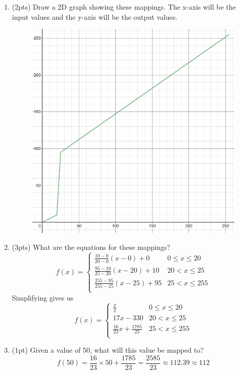 \documentclass{article}
\begin{document}
\begin{enumerate}
\begin{enumerate}
\item(2pts) Draw a 2D graph showing these mappings.  The x-axis will be the input values and the y-axis will be the output values.
\begin{figure}[h]
    \centering
    \includegraphics[scale=.5]{images/1-3-a.png}
\end{figure}


\item (3pts) What are the equations for these mappings?
$$ f(x) = \begin{cases}
    \frac{10-0}{20-0} (x-0) + 0         & 0 \leq x \leq 20 \\
    \frac{95-10}{25-20}(x-20) + 10      & 20 < x \leq 25 \\
    \frac{255-95}{255-25}(x-25) + 95    & 25 < x \leq 255 \\
 \end{cases} $$
Simplifying gives us
$$ f(x) = \begin{cases}
    \frac{x}{2}                         & 0 \leq x \leq 20  \\
    17x-330                             & 20 < x \leq 25    \\
    \frac{16}{23} x + \frac{1785}{23}   & 25 < x \leq 255   \\
 \end{cases} $$

\item (1pt) Given a value of 50, what will this value be mapped to?
$$f(50) = \frac{16}{23}\times 50 + \frac{1785}{23} = \frac{2585}{23} \approx 112.39 \approx 112 $$
\end{enumerate}
\end{enumerate}
\end{document}
